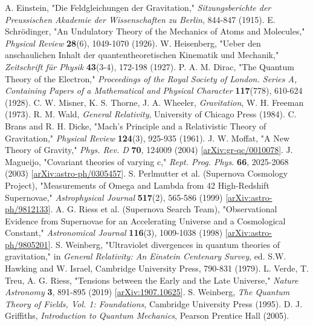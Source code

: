 \documentclass[11pt,a4paper]{article}
\begin{document}
\begin{thebibliography}{99}
 A. Einstein, "Die Feldgleichungen der Gravitation," \textit{Sitzungsberichte der Preussischen Akademie der Wissenschaften zu Berlin}, 844-847 (1915). 
 E. Schr\"odinger, "An Undulatory Theory of the Mechanics of Atoms and Molecules," \textit{Physical Review} \textbf{28}(6), 1049-1070 (1926). 
 W. Heisenberg, "Ueber den anschaulichen Inhalt der quantentheoretischen Kinematik und Mechanik," \textit{Zeitschrift f\"ur Physik} \textbf{43}(3-4), 172-198 (1927). 
 P. A. M. Dirac, "The Quantum Theory of the Electron," \textit{Proceedings of the Royal Society of London. Series A, Containing Papers of a Mathematical and Physical Character} \textbf{117}(778), 610-624 (1928). 
 C. W. Misner, K. S. Thorne, J. A. Wheeler, \textit{Gravitation}, W. H. Freeman (1973). 
 R. M. Wald, \textit{General Relativity}, University of Chicago Press (1984). 
 C. Brans and R. H. Dicke, "Mach's Principle and a Relativistic Theory of Gravitation," \textit{Physical Review} \textbf{124}(3), 925-935 (1961). 
 J. W. Moffat, "A New Theory of Gravity," \textit{Phys. Rev. D} \textbf{70}, 124009 (2004) [\url{arXiv:gr-qc/0010078}]. 
 J. Magueijo, "Covariant theories of varying c," \textit{Rept. Prog. Phys.} \textbf{66}, 2025-2068 (2003) [\url{arXiv:astro-ph/0305457}]. 
 S. Perlmutter et al. (Supernova Cosmology Project), "Measurements of Omega and Lambda from 42 High-Redshift Supernovae," \textit{Astrophysical Journal} \textbf{517}(2), 565-586 (1999) [\url{arXiv:astro-ph/9812133}]. 
 A. G. Riess et al. (Supernova Search Team), "Observational Evidence from Supernovae for an Accelerating Universe and a Cosmological Constant," \textit{Astronomical Journal} \textbf{116}(3), 1009-1038 (1998) [\url{arXiv:astro-ph/9805201}]. 
 S. Weinberg, "Ultraviolet divergences in quantum theories of gravitation," in \textit{General Relativity: An Einstein Centenary Survey}, ed. S.W. Hawking and W. Israel, Cambridge University Press, 790-831 (1979). 
 L. Verde, T. Treu, A. G. Riess, "Tensions between the Early and the Late Universe," \textit{Nature Astronomy} \textbf{3}, 891-895 (2019) [\url{arXiv:1907.10625}]. 
 S. Weinberg, \textit{The Quantum Theory of Fields, Vol. 1: Foundations}, Cambridge University Press (1995). 
 D. J. Griffiths, \textit{Introduction to Quantum Mechanics}, Pearson Prentice Hall (2005). 

\end{thebibliography}
\end{document}
